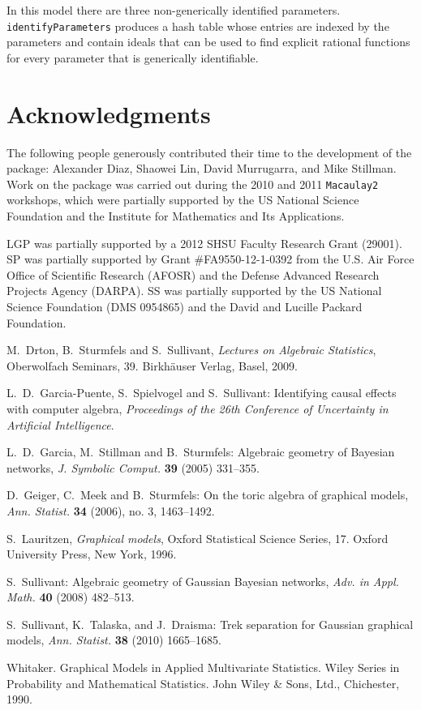 \documentclass[letterpaper]{article}
\theoremstyle{plain}
\theoremstyle{definition}
\begin{document}
In this model there are three non-generically identified parameters.  \texttt{identifyParameters} produces a hash table whose entries
are indexed by the parameters and contain ideals that can be used to find
explicit rational functions for every parameter that is generically
identifiable.

\section*{Acknowledgments }
The following people generously contributed their time to the
development of the package:  Alexander Diaz, Shaowei Lin, David Murrugarra, and Mike 
Stillman.  Work on the package was carried out during the 2010 and 2011
{\tt Macaulay2} workshops, which were partially supported by the US National 
Science Foundation and the Institute for Mathematics and Its
Applications.

LGP was partially supported by a 2012 SHSU Faculty Research Grant (29001).
SP was partially supported by Grant \#FA9550-12-1-0392 from the U.S. Air Force Office of Scientific Research (AFOSR) and the Defense Advanced Research Projects Agency (DARPA).
SS was partially supported by the US National Science Foundation (DMS 0954865) and the David and Lucille Packard Foundation.

\begin{spacing}{0.5}

\begin{thebibliography}{20}


M.~Drton, B.~Sturmfels and S.~Sullivant, \emph{Lectures on Algebraic Statistics}, 
Oberwolfach Seminars, 39. Birkh\"auser Verlag, Basel, 2009.


 L.~D.~Garcia-Puente, S.~Spielvogel and S.~Sullivant: Identifying
causal effects with computer algebra, {\em Proceedings of the 26th
Conference of Uncertainty in Artificial Intelligence}.

 L.~D.~Garcia, M.~Stillman and B.~Sturmfels: 
Algebraic geometry of Bayesian networks, {\em J. Symbolic Comput.}
  {\bf 39} (2005) 331--355.
  
D.~Geiger, C.~Meek and B.~Sturmfels: On the toric algebra of graphical
models, {\em Ann. Statist.} {\bf 34} (2006), no. 3, 1463--1492.


S.~Lauritzen,  \emph{Graphical models}, Oxford Statistical Science Series, 17. Oxford University Press, New York, 1996.


 S.~Sullivant: Algebraic geometry of Gaussian Bayesian
  networks, {\em Adv. in Appl. Math.} {\bf 40} (2008) 482--513.

S.~Sullivant, K.~Talaska, and J.~Draisma: Trek separation for Gaussian
graphical models, {\em Ann. Statist.} {\bf 38} (2010) 1665--1685. 



  Whitaker.  Graphical Models in Applied Multivariate
  Statistics. Wiley Series in Probability and Mathematical Statistics. John Wiley \& Sons, Ltd., Chichester, 1990.


\end{thebibliography}

\end{spacing}
\end{document}
